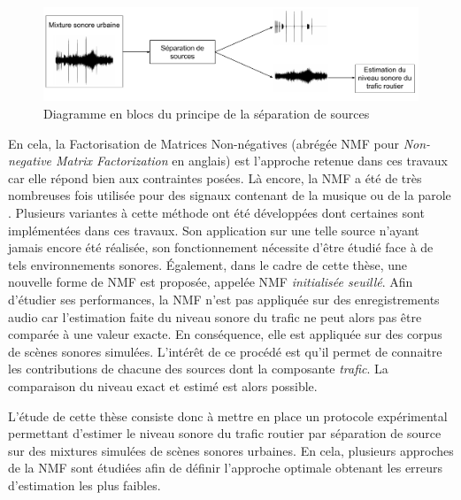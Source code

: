 \begin{figure}[h]
\centering
\includegraphics[width=\linewidth]{./figures/autres/schema_source_separation_FR.pdf}
\caption{Diagramme en blocs du principe de la séparation de sources}
\label{fig:separation_source_intro}
\end{figure}


En cela, la Factorisation de Matrices Non-négatives (abrégée NMF pour \textit{Non-negative Matrix Factorization} en anglais) \cite{lee_learning_1999} est l'approche retenue dans ces travaux car elle répond bien aux contraintes posées. Là encore, la NMF a été de très nombreuses fois utilisée pour des signaux contenant de la musique \cite{helen2005separation,fevotte_nonnegative_2009} ou de la parole \cite{wilson2008speech,schmidt2006single}. Plusieurs variantes à cette méthode ont été développées dont certaines sont implémentées dans ces travaux. Son application sur une telle source n'ayant jamais encore été réalisée, son fonctionnement nécessite d'être étudié face à de tels environnements sonores. Également, dans le cadre de cette thèse, une nouvelle forme de NMF est proposée, appelée NMF \textit{initialisée seuillé}. 
Afin d'étudier ses performances, la NMF n'est pas appliquée sur des enregistrements audio car l'estimation faite du niveau sonore du trafic ne peut alors pas être comparée à une valeur exacte. En conséquence, elle est appliquée sur des corpus de scènes sonores simulées. L'intérêt de ce procédé est qu'il permet de connaitre les contributions de chacune des sources dont la composante \textit{trafic}. La comparaison du niveau exact et estimé est alors possible.

L'étude de cette thèse consiste donc à mettre en place un protocole expérimental permettant d'estimer le niveau sonore du trafic routier par séparation de source sur des mixtures simulées de scènes sonores urbaines. En cela, plusieurs approches de la NMF sont étudiées afin de définir l'approche optimale obtenant les erreurs d'estimation les plus faibles.


